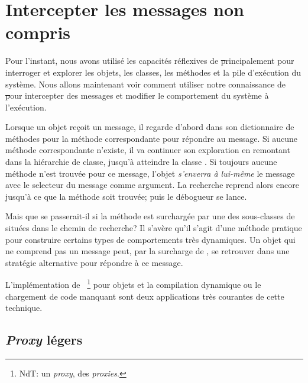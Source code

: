 \documentclass[a4paper,10pt,twoside]{book}
\begin{document}
\section{Intercepter les messages non compris}

Pour l'instant, nous avons utilisé les capacités réflexives de \st principalement pour interroger et explorer les objets, les classes, les méthodes et la pile d'exécution du système. Nous allons maintenant voir comment utiliser notre connaissance de \st pour intercepter des messages et modifier le comportement du système à l'exécution.

Lorsque un objet reçoit un message, il regarde d'abord dans son dictionnaire de méthodes pour la méthode correspondante pour répondre au message.
Si aucune méthode correspondante n'existe, il va continuer son exploration en remontant dans la hiérarchie de classe, jusqu'à atteindre la classe .
Si toujours aucune méthode n'est trouvée pour ce message, l'objet \emph{s'enverra à lui-même} %
le message  avec le selecteur du message comme argument.
La recherche reprend alors encore jusqu'à ce que la méthode
 soit trouvée; puis le débogueur se lance.

Mais que se passerait-il si la méthode  est surchargée 
par une des sous-classes de  situées dans le chemin de recherche? %
Il s'avère qu'il s'agit d'une méthode pratique pour construire certains types de comportements très dynamiques. Un objet qui ne comprend pas un message peut, par la surcharge de , se retrouver dans une stratégie alternative pour répondre à ce message.

L'implémentation de ~\footnote{NdT: un \emph{proxy}, des \emph{proxies}.} pour objets et la compilation dynamique ou le chargement de code manquant sont deux applications très courantes de cette technique.

\subsection{\emph{Proxy} légers}
\end{document}
